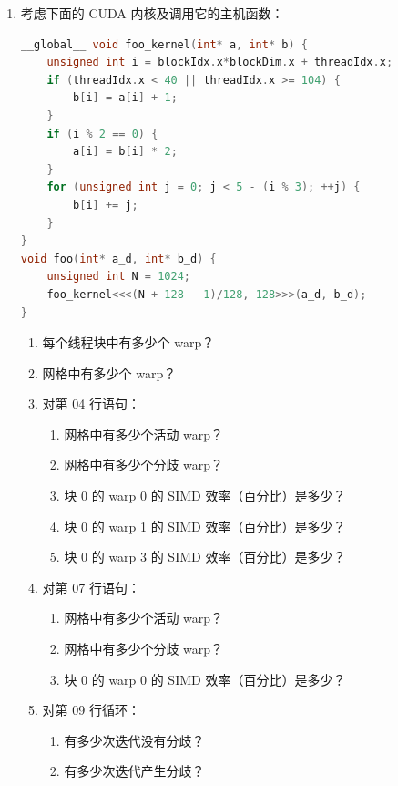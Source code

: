 \begin{enumerate}[label=\arabic*.,leftmargin=2.7em]
  \item 考虑下面的 CUDA 内核及调用它的主机函数：

\begin{lstlisting}[language=C++,firstnumber=1]
__global__ void foo_kernel(int* a, int* b) {
    unsigned int i = blockIdx.x*blockDim.x + threadIdx.x;
    if (threadIdx.x < 40 || threadIdx.x >= 104) {
        b[i] = a[i] + 1;
    }
    if (i % 2 == 0) {
        a[i] = b[i] * 2;
    }
    for (unsigned int j = 0; j < 5 - (i % 3); ++j) {
        b[i] += j;
    }
}
void foo(int* a_d, int* b_d) {
    unsigned int N = 1024;
    foo_kernel<<<(N + 128 - 1)/128, 128>>>(a_d, b_d);
}
\end{lstlisting}

  \begin{enumerate}[label=\alph*.,leftmargin=2.2em]
    \item 每个线程块中有多少个 warp？
    \item 网格中有多少个 warp？
    \item 对第 04 行语句：
      \begin{enumerate}[label=\roman*.,leftmargin=2em]
        \item 网格中有多少个活动 warp？
        \item 网格中有多少个分歧 warp？
        \item 块 0 的 warp 0 的 SIMD 效率（百分比）是多少？
        \item 块 0 的 warp 1 的 SIMD 效率（百分比）是多少？
        \item 块 0 的 warp 3 的 SIMD 效率（百分比）是多少？
      \end{enumerate}
    \item 对第 07 行语句：
      \begin{enumerate}[label=\roman*.,leftmargin=2em]
        \item 网格中有多少个活动 warp？
        \item 网格中有多少个分歧 warp？
        \item 块 0 的 warp 0 的 SIMD 效率（百分比）是多少？
      \end{enumerate}
    \item 对第 09 行循环：
      \begin{enumerate}[label=\roman*.,leftmargin=2em]
        \item 有多少次迭代没有分歧？
        \item 有多少次迭代产生分歧？
      \end{enumerate}
  \end{enumerate}


\end{enumerate}
